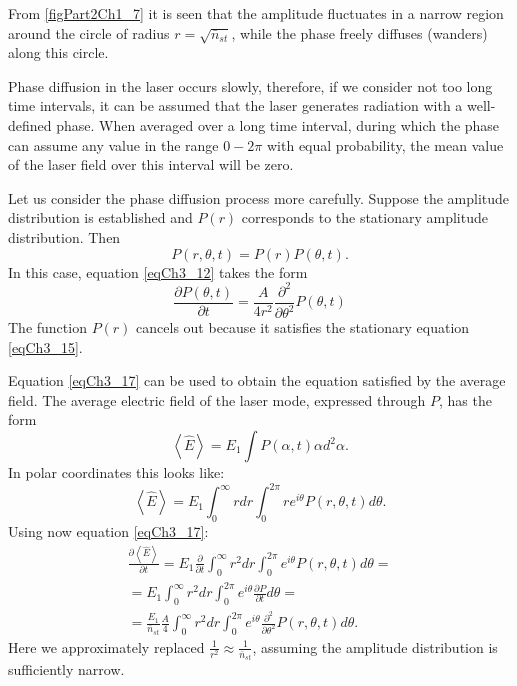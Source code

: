 From \autoref{figPart2Ch1_7} it is seen that the amplitude fluctuates in a narrow region around the circle of radius $r = \sqrt{\bar{n}_{st}}$, while the phase
freely diffuses (wanders) along this circle. 

Phase diffusion in the laser occurs slowly, therefore, if
we consider not too long time intervals, it can be assumed
that the laser generates radiation with a well-defined phase. When
averaged over a long time interval, during which the phase can assume any value
in the range $0 - 2\pi$ with equal probability, the mean value of the laser field over this interval
will be zero.  

Let us consider the phase diffusion process more carefully. Suppose
the amplitude distribution is established and $P\left(r\right)$
corresponds to the stationary amplitude distribution. Then
\[
P\left(r, \theta, t\right) = P\left(r\right) P\left(\theta, t\right).
\]
In this case, equation \eqref{eqCh3_12} takes the form 
\begin{equation}
\frac{\partial P \left(\theta, t\right)}{\partial t} = 
\frac{A}{4 r^2}
\frac{\partial^2}{\partial \theta^2}
P \left(\theta, t\right)
\label{eqCh3_17}
\end{equation}
The function $P\left(r\right)$ cancels out because it satisfies the stationary equation \eqref{eqCh3_15}. 

Equation \eqref{eqCh3_17} can be used to obtain the equation satisfied by the average field. The average electric field of the laser mode,
expressed through $P$, has the form  
\[
\left<\hat{E}\right> = E_1 \int P\left(\alpha, t\right) \alpha d^2
\alpha.
\]
In polar coordinates this looks like:
\[
\left<\hat{E}\right> = E_1 \int_{0}^{\infty}r dr \int_0^{2 \pi}r e^{i
  \theta} P\left(r, \theta, t\right) d \theta.
\]
Using now equation \eqref{eqCh3_17}:
\begin{eqnarray}
\frac{\partial \left<\hat{E}\right>}{\partial t}
= E_1 \frac{\partial}{\partial t} \int_{0}^{\infty}r^2 dr \int_0^{2
  \pi} e^{i
  \theta} P\left(r, \theta, t\right) d \theta = 
\nonumber \\
= E_1 \int_0^{\infty}r^2 dr \int_0^{2\pi}e^{i\theta}\frac{\partial
  P}{\partial t} d \theta
=
\nonumber \\
= \frac{E_1}{\bar{n}_{st}} \frac{A}{4}
\int_{0}^{\infty}r^2 dr \int_0^{2 \pi}e^{i
  \theta} \frac{\partial^2}{\partial \theta^2} P\left(r, \theta,
t\right) d \theta. 
\label{eqCh3_18}
\end{eqnarray}
Here we approximately replaced $\frac{1}{r^2} \approx
\frac{1}{\bar{n}_{st}}$, assuming the amplitude distribution is sufficiently
narrow. 

